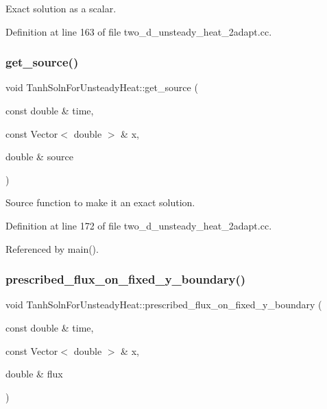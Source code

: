Exact solution as a scalar. 



Definition at line 163 of file two\+\_\+d\+\_\+unsteady\+\_\+heat\+\_\+2adapt.\+cc.

\mbox{\label{namespaceTanhSolnForUnsteadyHeat_aea922a29dfeeb80ef4768def0d6fbde4}} 
\subsubsection{\texorpdfstring{get\+\_\+source()}{get\_source()}}
{\footnotesize\ttfamily void Tanh\+Soln\+For\+Unsteady\+Heat\+::get\+\_\+source (\begin{DoxyParamCaption}\item[{const double \&}]{time,  }\item[{const Vector$<$ double $>$ \&}]{x,  }\item[{double \&}]{source }\end{DoxyParamCaption})}



Source function to make it an exact solution. 



Definition at line 172 of file two\+\_\+d\+\_\+unsteady\+\_\+heat\+\_\+2adapt.\+cc.



Referenced by main().

\mbox{\label{namespaceTanhSolnForUnsteadyHeat_af4d78d73bd9981a5a9ecacecfd0e9cb8}} 
\subsubsection{\texorpdfstring{prescribed\+\_\+flux\+\_\+on\+\_\+fixed\+\_\+y\+\_\+boundary()}{prescribed\_flux\_on\_fixed\_y\_boundary()}}
{\footnotesize\ttfamily void Tanh\+Soln\+For\+Unsteady\+Heat\+::prescribed\+\_\+flux\+\_\+on\+\_\+fixed\+\_\+y\+\_\+boundary (\begin{DoxyParamCaption}\item[{const double \&}]{time,  }\item[{const Vector$<$ double $>$ \&}]{x,  }\item[{double \&}]{flux }\end{DoxyParamCaption})}



